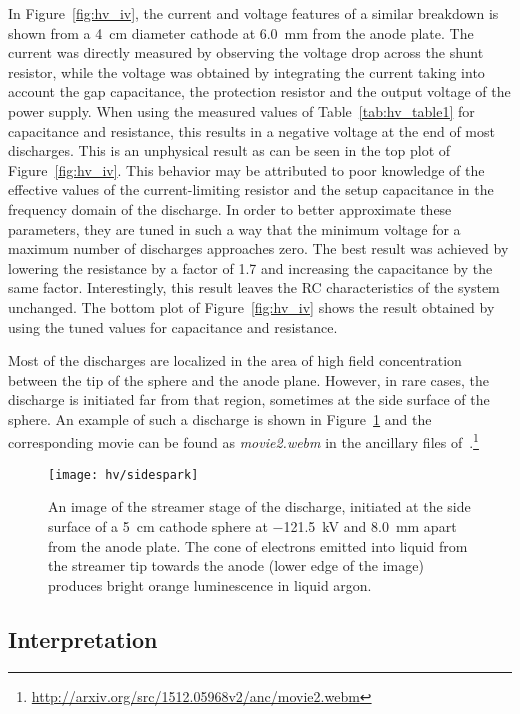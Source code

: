 In Figure~\ref{fig:hv_iv}, the current and voltage features of a similar breakdown is shown from a \SI{4}{\centi\metre} diameter cathode at \SI{6.0}{\milli\metre} from the anode plate.
The current was directly measured by observing the voltage drop across the shunt resistor, while the voltage was obtained by integrating the current taking into account the gap capacitance, the protection resistor and the output voltage of the power supply.
When using the measured values of Table~\ref{tab:hv_table1} for capacitance and resistance, this results in a negative voltage at the end of most discharges.
This is an unphysical result as can be seen in the top plot of Figure~\ref{fig:hv_iv}.
This behavior may be attributed to poor knowledge of the effective values of the current-limiting resistor and the setup capacitance in the frequency domain of the discharge.
In order to better approximate these parameters, they are tuned in such a way that the minimum voltage for a maximum number of discharges approaches zero.
The best result was achieved by lowering the resistance by a factor of 1.7 and increasing the capacitance by the same factor.
Interestingly, this result leaves the RC characteristics of the system unchanged.
The bottom plot of Figure~\ref{fig:hv_iv} shows the result obtained by using the tuned values for capacitance and resistance.

Most of the discharges are localized in the area of high field concentration between the tip of the sphere and the anode plane.
However, in rare cases, the discharge is initiated far from that region, sometimes at the side surface of the sphere.
An example of such a discharge is shown in Figure~\ref{fig:hv_side} and the corresponding movie can be found as \emph{movie2.webm} in the ancillary files of~\cite{breakdown_16}.\footnote{\url{http://arxiv.org/src/1512.05968v2/anc/movie2.webm}}

\begin{figure}[htb]
	\centering	
	\texttt{[image: hv/sidespark]}
	\caption{An image of the streamer stage of the discharge, initiated at the side surface of a \SI{5}{\centi\metre} cathode sphere at \SI{-121.5}{\kilo\volt} and \SI{8.0}{\milli\metre} apart from the anode plate. The cone of electrons emitted into liquid from the streamer tip towards the anode (lower edge of the image) produces bright orange luminescence in liquid argon.}
	\label{fig:hv_side}
\end{figure}


\subsection{Interpretation}
\label{sec:studies_hv_interpretation}

